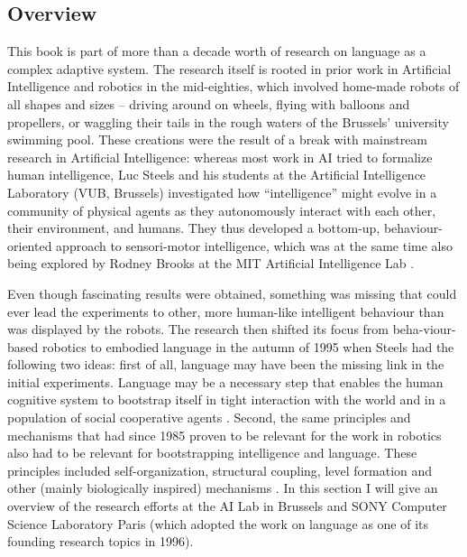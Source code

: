 \subsection{Overview}
This book is part of more than a decade worth of research on language as a complex adaptive system. The research itself is rooted in prior work in Artificial Intelligence and robotics in the mid-eighties, which involved home-made robots of all shapes and sizes -- driving around on wheels, flying with balloons and propellers, or waggling their tails in the rough waters of the Brussels' university swimming pool. These creations were the result of a break with mainstream research in Artificial Intelligence: whereas most work in AI tried to formalize human intelligence, Luc Steels and his students at the Artificial Intelligence Laboratory (VUB, Brussels) investigated how ``intelligence'' might evolve in a community of physical agents as they autonomously interact with each other, their environment, and humans. They thus developed a bottom-up, behaviour-oriented approach to sensori-motor intelligence, which was at the same time also being explored by Rodney Brooks at the MIT Artificial Intelligence Lab \citep{steels95alife-route}.

Even though fascinating results were obtained, something was missing that could ever lead the experiments to other, more human-like intelligent behaviour than was displayed by the robots. The research then shifted its focus from beha-viour-based robotics to embodied language in the autumn of 1995 when Steels had the following two ideas: first of all, language may have been the missing link in the initial experiments. Language may be a necessary step that enables the human cognitive system to bootstrap itself in tight interaction with the world and in a population of social cooperative agents \citep{steels03intelligence}. Second, the same principles and mechanisms that had since 1985 proven to be relevant for the work in robotics also had to be relevant for bootstrapping intelligence and language. These principles included self-organization, structural coupling, level formation and other (mainly biologically inspired) mechanisms \citep{steels97synthesising}. In this section I will give an overview of the research efforts at the AI Lab in Brussels and SONY Computer Science Laboratory Paris (which adopted the work on language as one of its founding research topics in 1996).

